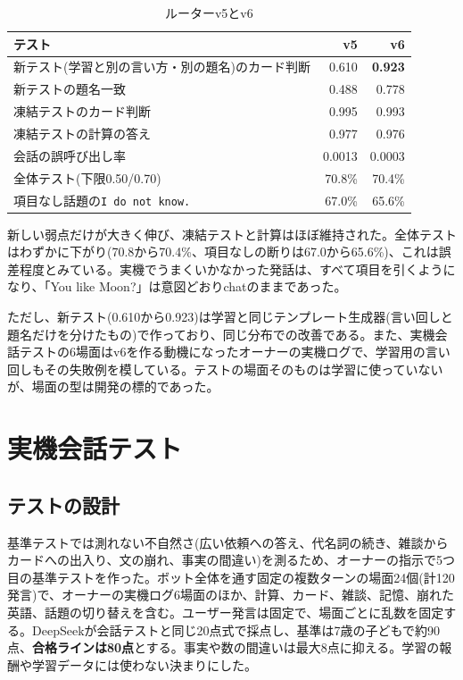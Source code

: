 \documentclass[a4paper,11pt]{article}
\newcommand{\IDK}{\texttt{I do not know.}}
\begin{document}
\begin{table}[H]\centering\small
\caption{ルーターv5とv6}\label{tab:v6}
\begin{tabular}{lrr}\toprule
テスト & v5 & v6\\\midrule
新テスト(学習と別の言い方・別の題名)のカード判断 & 0.610 & \textbf{0.923}\\
新テストの題名一致 & 0.488 & 0.778\\
凍結テストのカード判断 & 0.995 & 0.993\\
凍結テストの計算の答え & 0.977 & 0.976\\
会話の誤呼び出し率 & 0.0013 & 0.0003\\
全体テスト(下限0.50/0.70) & 70.8\% & 70.4\%\\
項目なし話題の\IDK & 67.0\% & 65.6\%\\\bottomrule
\end{tabular}\end{table}

新しい弱点だけが大きく伸び、凍結テストと計算はほぼ維持された。全体テストはわずかに下がり(70.8から70.4\%、項目なしの断りは67.0から65.6\%)、これは誤差程度とみている。実機でうまくいかなかった発話は、すべて項目を引くようになり、「You like Moon?」は意図どおりchatのままであった。

ただし、新テスト(0.610から0.923)は学習と同じテンプレート生成器(言い回しと題名だけを分けたもの)で作っており、同じ分布での改善である。また、実機会話テストの6場面はv6を作る動機になったオーナーの実機ログで、学習用の言い回しもその失敗例を模している。テストの場面そのものは学習に使っていないが、場面の型は開発の標的であった。

\section{実機会話テスト}
\subsection{テストの設計}
基準テストでは測れない不自然さ(広い依頼への答え、代名詞の続き、雑談からカードへの出入り、文の崩れ、事実の間違い)を測るため、オーナーの指示で5つ目の基準テストを作った。ボット全体を通す固定の複数ターンの場面24個(計120発言)で、オーナーの実機ログ6場面のほか、計算、カード、雑談、記憶、崩れた英語、話題の切り替えを含む。ユーザー発言は固定で、場面ごとに乱数を固定する。DeepSeekが会話テストと同じ20点式で採点し、基準は7歳の子どもで約90点、\textbf{合格ラインは80点}とする。事実や数の間違いは最大8点に抑える。学習の報酬や学習データには使わない決まりにした。
\end{document}
